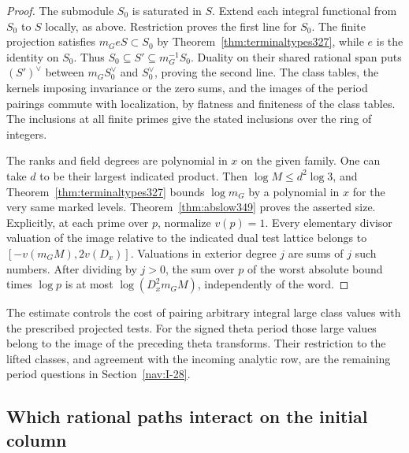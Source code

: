 \documentclass[a4paper,11pt]{article}
\theoremstyle{definition}
\theoremstyle{remark}
\numberwithin{equation}{section}
\begin{document}
\begin{proof}
The submodule \(S_0\) is saturated in \(S\). Extend each
integral functional from \(S_0\) to \(S\) locally, as above.
Restriction proves the first line for \(S_0\).
The finite projection satisfies \(m_G eS\subset S_0\) by
Theorem~\ref{thm:terminaltypes327}, while \(e\) is the
identity on \(S_0\). Thus
\(S_0\subseteq S'\subseteq m_G^{-1} S_0\).
Duality on their shared rational span puts \((S')^\vee\)
between \(m_G S_0^\vee\) and \(S_0^\vee\), proving the
second line. The class tables, the kernels imposing invariance
or the zero sums, and the images of the period pairings commute
with localization, by flatness and finiteness of the class
tables. The inclusions at all finite primes give the stated
inclusions over the ring of integers.

The ranks and field degrees are polynomial in \(x\) on the given
family. One can take \(d\) to be their largest indicated product.
Then \(\log M\le d^2\log 3\), and
Theorem~\ref{thm:terminaltypes327} bounds \(\log m_G\)
by a polynomial in \(x\) for the very same marked levels.
Theorem~\ref{thm:abslow349} proves the asserted size.
Explicitly, at each prime over \(p\), normalize \(v(p)=1\).
Every elementary divisor valuation of the image relative to the
indicated dual test lattice belongs to
\([-v(m_GM),2v(D_x)]\). Valuations in exterior degree \(j\)
are sums of \(j\) such numbers. After dividing by \(j>0\),
the sum over \(p\) of the worst absolute bound times \(\log p\)
is at most \(\log(D_x^2m_GM)\), independently of the word.
\end{proof}

The estimate controls the cost of pairing arbitrary integral
large class values with the prescribed projected tests. For the
signed theta period those large values belong to the image of
the preceding theta transforms. Their restriction to the lifted
classes, and agreement with the incoming analytic row, are the
remaining period questions in Section~\ref{nav:I-28}.


\subsection{Which rational paths interact on the initial column}\label{sec:pathnorm352}
\end{document}
